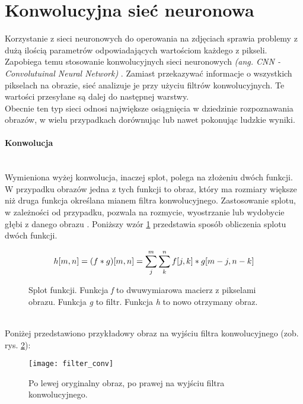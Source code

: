 \section{Konwolucyjna sieć neuronowa}

Korzystanie z sieci neuronowych do operowania na zdjęciach sprawia problemy
z dużą ilością parametrów odpowiadających wartościom każdego z pikseli.
Zapobiega temu stosowanie konwolucyjnych sieci neuronowych \textit{(ang. CNN - Convolutuinal Neural Network)} \cite{intuitiveExplanation, WIKIcnn}.
Zamiast przekazywać informacje o wszystkich pikselach
na obrazie, sieć analizuje je przy użyciu filtrów konwolucyjnych.
Te wartości przesyłane są dalej do następnej warstwy.\\
Obecnie ten typ sieci odnosi największe osiągnięcia w dziedzinie rozpoznawania obrazów,
w wielu przypadkach dorównując lub nawet pokonując ludzkie wyniki.

\paragraph{Konwolucja} \mbox{}\\
Wymieniona wyżej konwolucja, inaczej splot, polega na złożeniu dwóch funkcji. W przypadku obrazów
jedna z tych funkcji to obraz, który ma rozmiary większe niż druga funkcja określana
mianem filtra konwolucyjnego. Zastosowanie splotu, w zależności od przypadku,
pozwala na rozmycie, wyostrzanie lub wydobycie głębi z danego obrazu \cite{konwolucja}.
Poniższy wzór \ref{eq:conv} przedstawia sposób obliczenia splotu dwóch funkcji.
\begin{figure}[h!]
\renewcommand{\figurename}{Wzór}%
\begin{equation*}
h[m, n] = (f * g)[m, n] = \sum_j^m \sum_k^n f[j, k] * g[m-j, n-k] \\
\end{equation*}
\centering
\captionsetup{justification=centering,margin=1cm}
\caption{Splot funkcji. Funkcja \textit{f} to dwuwymiarowa macierz z pikselami obrazu. Funkcja \textit{g} to filtr. Funkcja \textit{h} to nowo otrzymany obraz.}
\label{eq:conv}
\end{figure}\\
Poniżej przedstawiono przykładowy obraz na wyjściu filtra konwolucyjnego (zob. rys. \ref{fig:filter_conv}):
\begin{figure}[h!]
\centering
\texttt{[image: filter\_conv]}
\centering
\caption{Po lewej oryginalny obraz, po prawej na wyjściu filtra konwolucyjnego.}
\label{fig:filter_conv}
\end{figure}

